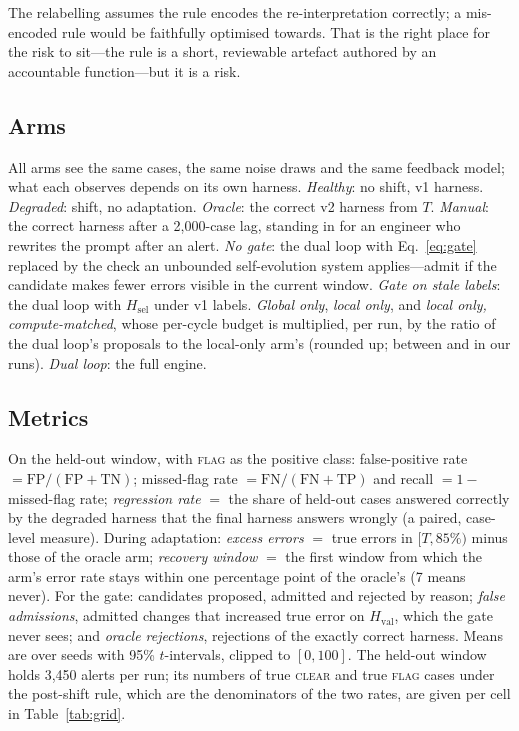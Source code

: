 \documentclass[11pt]{article}
\newcommand{\Hsel}{H_{\mathrm{sel}}}
\newcommand{\Hval}{H_{\mathrm{val}}}
\begin{document}
The relabelling assumes the rule encodes the re-interpretation correctly; a mis-encoded rule would be faithfully optimised towards. That is the right place for the risk to sit---the rule is a short, reviewable artefact authored by an accountable function---but it is a risk.

\subsection{Arms}

All arms see the same cases, the same noise draws and the same feedback model; what each observes depends on its own harness. \emph{Healthy}: no shift, v1 harness. \emph{Degraded}: shift, no adaptation. \emph{Oracle}: the correct v2 harness from $T$. \emph{Manual}: the correct harness after a 2{,}000-case lag, standing in for an engineer who rewrites the prompt after an alert. \emph{No gate}: the dual loop with Eq.~\eqref{eq:gate} replaced by the check an unbounded self-evolution system applies---admit if the candidate makes fewer errors visible in the current window. \emph{Gate on stale labels}: the dual loop with $\Hsel$ under v1 labels. \emph{Global only}, \emph{local only}, and \emph{local only, compute-matched}, whose per-cycle budget is multiplied, per run, by the ratio of the dual loop's proposals to the local-only arm's (rounded up; between \cmScaleMin{} and \cmScaleMax{} in our runs). \emph{Dual loop}: the full engine.

\subsection{Metrics}

On the held-out window, with \textsc{flag} as the positive class: false-positive rate $=\mathrm{FP}/(\mathrm{FP}+\mathrm{TN})$; missed-flag rate $=\mathrm{FN}/(\mathrm{FN}+\mathrm{TP})$ and recall $=1-$missed-flag rate; \emph{regression rate} $=$ the share of held-out cases answered correctly by the degraded harness that the final harness answers wrongly (a paired, case-level measure). During adaptation: \emph{excess errors} $=$ true errors in $[T,85\%)$ minus those of the oracle arm; \emph{recovery window} $=$ the first window from which the arm's error rate stays within one percentage point of the oracle's (7 means never). For the gate: candidates proposed, admitted and rejected by reason; \emph{false admissions}, admitted changes that increased true error on $\Hval$, which the gate never sees; and \emph{oracle rejections}, rejections of the exactly correct harness. Means are over seeds with 95\% $t$-intervals, clipped to $[0,100]$. The held-out window holds 3{,}450 alerts per run; its numbers of true \textsc{clear} and true \textsc{flag} cases under the post-shift rule, which are the denominators of the two rates, are given per cell in Table~\ref{tab:grid}.
\end{document}
